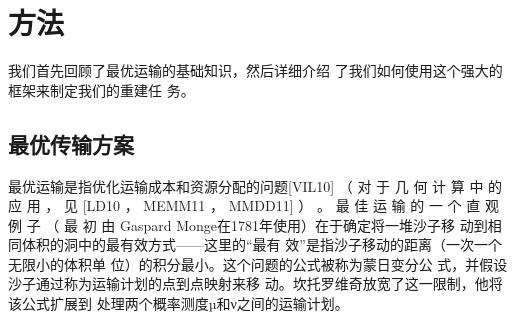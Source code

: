 \section{方法}

我们首先回顾了最优运输的基础知识，然后详细介绍
了我们如何使用这个强大的框架来制定我们的重建任
务。

\subsection{最优传输方案}

最优运输是指优化运输成本和资源分配的问题[VIL10]
（ 对 于 几 何 计 算 中 的 应 用 ， 见 [LD10 ， MEMM11 ，
MMDD11] ） 。 最 佳 运 输 的 一 个 直 观 例 子 （ 最 初 由
Gaspard Monge在1781年使用）在于确定将一堆沙子移
动到相同体积的洞中的最有效方式——这里的“最有
效”是指沙子移动的距离（一次一个无限小的体积单
位）的积分最小。这个问题的公式被称为蒙日变分公
式，并假设沙子通过称为运输计划的点到点映射来移
动。坎托罗维奇放宽了这一限制，他将该公式扩展到
处理两个概率测度µ和ν之间的运输计划。